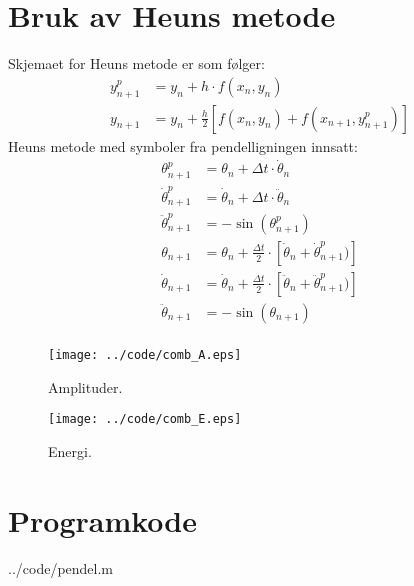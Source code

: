 \section{Bruk av Heuns metode} %
\label{sec:bruk_av_heuns_metode}
Skjemaet for Heuns metode er som følger:
\begin{align}
  y_{n+1}^p &=  y_n + h \cdot f(x_n,y_n) \\
  y_{n+1}   &=  y_n + \frac{h}{2} \left[f(x_n,y_n)+f(x_{n+1},y_{n+1}^p)\right]
\end{align}
Heuns metode med symboler fra pendelligningen innsatt:
\begin{align}
  \theta_{n+1}^p &= \theta_n + \Delta t \cdot \dot\theta_n \\
  \dot\theta_{n+1}^p &= \dot\theta_n + \Delta t \cdot \ddot\theta_n \\
  \ddot\theta_{n+1}^p &= -\sin (\theta_{n+1}^p) \\                   
  \theta_{n+1}     &= \theta_n + \frac{\Delta t}{2} \cdot 
                      \left[\dot\theta_n+\dot\theta_{n+1}^p)\right] \\
  \dot\theta_{n+1} &= \dot\theta_n + \frac{\Delta t}{2} \cdot 
                      \left[\ddot\theta_n+\ddot\theta_{n+1}^p)\right] \\
  \ddot\theta_{n+1} &= -\sin (\theta_{n+1}) \\                   
\end{align}


\begin{figure}[H]
  \centering
  \texttt{[image: ../code/comb\_A.eps]}
  \caption{Amplituder.}
  \label{fig:amp}
\end{figure}

\begin{figure}[H]
  \centering
  \texttt{[image: ../code/comb\_E.eps]}
  \caption{Energi.}
  \label{fig:energi}
\end{figure}


\clearpage
\section{Programkode} %
\label{sec:programkode}

  {../code/pendel.m}

